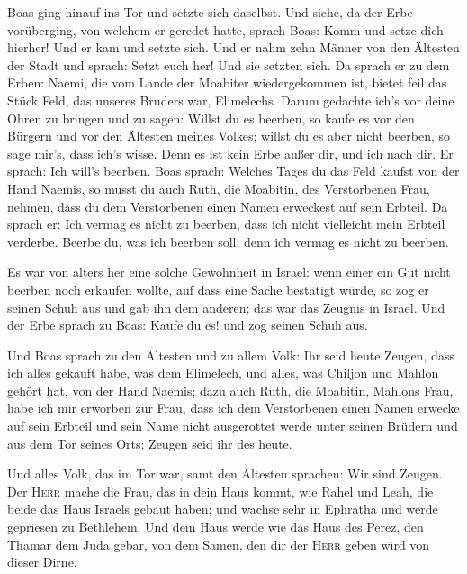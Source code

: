  Boas ging hinauf ins Tor und setzte sich daselbst. Und
siehe, da der Erbe vorüberging, von welchem er geredet hatte, sprach
Boas: Komm und setze dich hierher! Und er kam und setzte sich.
 Und er nahm zehn Männer von den Ältesten der Stadt und
sprach: Setzt euch her! Und sie setzten sich.  Da sprach
er zu dem Erben: Naemi, die vom Lande der Moabiter wiedergekommen ist,
bietet feil das Stück Feld, das unseres Bruders war, Elimelechs.
 Darum gedachte ich's vor deine Ohren zu bringen und zu
sagen: Willst du es beerben, so kaufe es vor den Bürgern und vor den
Ältesten meines Volkes; willst du es aber nicht beerben, so sage mir's,
dass ich's wisse. Denn es ist kein Erbe außer dir, und ich nach dir. Er
sprach: Ich will's beerben.  Boas sprach: Welches Tages du
das Feld kaufst von der Hand Naemis, so musst du auch Ruth, die
Moabitin, des Verstorbenen Frau, nehmen, dass du dem Verstorbenen einen
Namen erweckest auf sein Erbteil.  Da sprach er: Ich
vermag es nicht zu beerben, dass ich nicht vielleicht mein Erbteil
verderbe. Beerbe du, was ich beerben soll; denn ich vermag es nicht zu
beerben.

 Es war von alters her eine solche Gewohnheit in Israel:
wenn einer ein Gut nicht beerben noch erkaufen wollte, auf dass eine
Sache bestätigt würde, so zog er seinen Schuh aus und gab ihn dem
anderen; das war das Zeugnis in Israel.  Und der Erbe
sprach zu Boas: Kaufe du es! und zog seinen Schuh aus.

 Und Boas sprach zu den Ältesten und zu allem Volk: Ihr
seid heute Zeugen, dass ich alles gekauft habe, was dem Elimelech, und
alles, was Chiljon und Mahlon gehört hat, von der Hand Naemis;
 dazu auch Ruth, die Moabitin, Mahlons Frau, habe ich mir
erworben zur Frau, dass ich dem Verstorbenen einen Namen erwecke auf
sein Erbteil und sein Name nicht ausgerottet werde unter seinen Brüdern
und aus dem Tor seines Orts; Zeugen seid ihr des heute.

 Und alles Volk, das im Tor war, samt den Ältesten
sprachen: Wir sind Zeugen. Der \textsc{Herr} mache die Frau, das in dein
Haus kommt, wie Rahel und Leah, die beide das Haus Israels gebaut haben;
und wachse sehr in Ephratha und werde gepriesen zu Bethlehem.
 Und dein Haus werde wie das Haus des Perez, den Thamar
dem Juda gebar, von dem Samen, den dir der \textsc{Herr} geben wird von
dieser Dirne.

